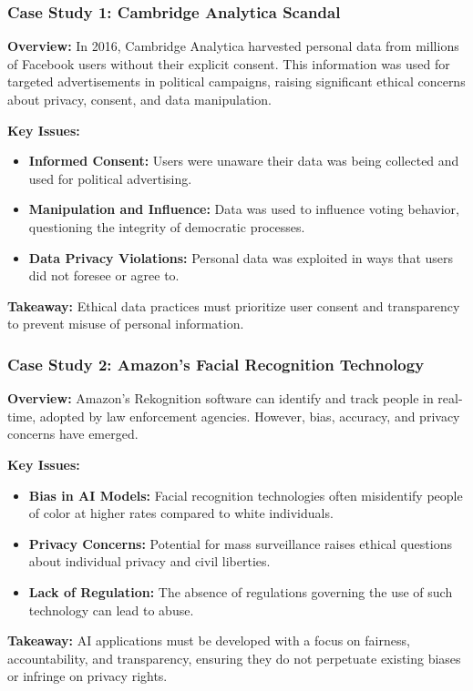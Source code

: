 \documentclass[aspectratio=169]{beamer}
\begin{document}
\begin{frame}[fragile]
    \frametitle{Case Study 1: Cambridge Analytica Scandal}
    
    \textbf{Overview:}
    In 2016, Cambridge Analytica harvested personal data from millions of Facebook users without their explicit consent. This information was used for targeted advertisements in political campaigns, raising significant ethical concerns about privacy, consent, and data manipulation.
    
    \textbf{Key Issues:}
    \begin{itemize}
        \item \textbf{Informed Consent:} Users were unaware their data was being collected and used for political advertising.
        \item \textbf{Manipulation and Influence:} Data was used to influence voting behavior, questioning the integrity of democratic processes.
        \item \textbf{Data Privacy Violations:} Personal data was exploited in ways that users did not foresee or agree to.
    \end{itemize}

    \textbf{Takeaway:} 
    Ethical data practices must prioritize user consent and transparency to prevent misuse of personal information.
\end{frame}

\begin{frame}[fragile]
    \frametitle{Case Study 2: Amazon's Facial Recognition Technology}
    
    \textbf{Overview:}
    Amazon's Rekognition software can identify and track people in real-time, adopted by law enforcement agencies. However, bias, accuracy, and privacy concerns have emerged.

    \textbf{Key Issues:}
    \begin{itemize}
        \item \textbf{Bias in AI Models:} Facial recognition technologies often misidentify people of color at higher rates compared to white individuals.
        \item \textbf{Privacy Concerns:} Potential for mass surveillance raises ethical questions about individual privacy and civil liberties.
        \item \textbf{Lack of Regulation:} The absence of regulations governing the use of such technology can lead to abuse.
    \end{itemize}

    \textbf{Takeaway:}
    AI applications must be developed with a focus on fairness, accountability, and transparency, ensuring they do not perpetuate existing biases or infringe on privacy rights.
\end{frame}
\end{document}
